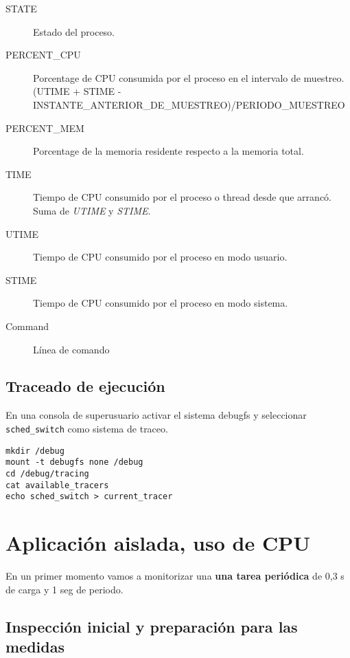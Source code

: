 \documentclass[a4paper,11pt,spanish,twoside]{article}
\begin{document}
\begin{itemize}
\begin{description}
    \item[STATE] Estado del proceso.


    \item[PERCENT\_CPU] Porcentage de CPU consumida por el proceso en
      el intervalo de muestreo. (UTIME + STIME - INSTANTE\_ANTERIOR\_DE\_MUESTREO)/PERIODO\_MUESTREO


    \item[PERCENT\_MEM] Porcentage de la memoria residente respecto a
      la memoria total.


    \item[TIME] Tiempo de CPU consumido por el proceso o thread desde que
      arrancó.  Suma de \emph{UTIME} y \emph{STIME}.


    \item[UTIME] Tiempo de CPU consumido por el proceso en modo
      usuario.


    \item[STIME] Tiempo de CPU consumido por el proceso en modo
      sistema.


    \item[Command] Línea de comando

    \end{description}

  \end{itemize}


\subsection{Traceado de ejecución}
\label{sec:traceado}

En una consola de superusuario activar el sistema debugfs y
seleccionar \texttt{sched\_switch} como sistema de traceo.

\begin{lstlisting}
mkdir /debug
mount -t debugfs none /debug
cd /debug/tracing
cat available_tracers
echo sched_switch > current_tracer
\end{lstlisting}




\section{Aplicación aislada, uso de CPU}
\label{sec:entorno}

En un primer momento vamos a monitorizar  una \textbf{una tarea periódica} de
0,3 s de carga y 1 seg de periodo.


\subsection{Inspección inicial y preparación para las medidas}
\label{sec:verificacioncualitativa}
\end{document}
